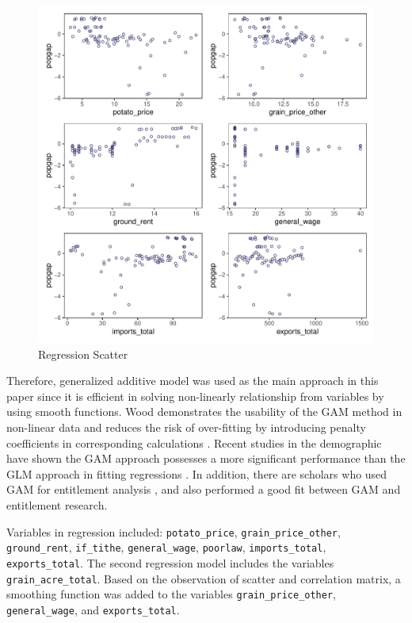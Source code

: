 \begin{figure}[h]
    \centering
    \caption{Regression Scatter}
    \includegraphics[width=.95\textwidth]{../03_outputs/regression_scatter.pdf}
\end{figure}

Therefore, generalized additive model was used as the main approach in this paper since it is efficient in solving non-linearly relationship from variables by using smooth functions. Wood demonstrates the usability of the GAM method in non-linear data and reduces the risk of over-fitting by introducing penalty coefficients in corresponding calculations \citep{wood2001mgcv}. Recent studies in the demographic have shown the GAM approach possesses a more significant performance than the GLM approach in fitting regressions \citep{potts2018evaluation}. In addition, there are scholars who used GAM for entitlement analysis \citep{ardyanto2006granting}, and also performed a good fit between GAM and entitlement research.

Variables in regression included: \texttt{potato\_price}, \texttt{grain\_price\_other}, \texttt{ground\_rent}, \texttt{if\_tithe}, \texttt{general\_wage}, \texttt{poorlaw}, \texttt{imports\_total}, \texttt{exports\_total}. The second regression model includes the variables \texttt{grain\_acre\_total}. Based on the observation of scatter and correlation matrix, a smoothing function was added to the variables \texttt{grain\_price\_other}, \texttt{general\_wage}, and \texttt{exports\_total}. 


